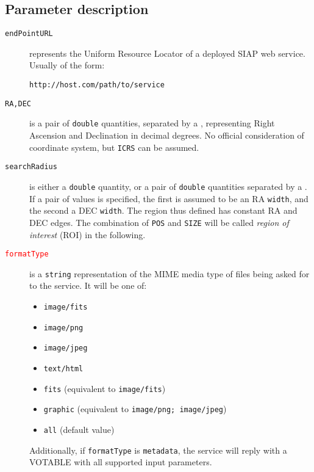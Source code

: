 	\subsection{Parameter description} %
	\label{sub:parameter_description_siap}
	\begin{description}
		\item[\texttt{endPointURL}] represents the Uniform Resource 
		Locator of a deployed SIAP web service. 
		Usually of the form:
		
		\texttt{http://host.com/path/to/service}

		\item[\texttt{RA,DEC}] is a pair of \texttt{double} 
		quantities, separated by a \comma, 
		representing Right Ascension and Declination 
		in decimal degrees. No official consideration of coordinate 
		system, but \texttt{ICRS} can be assumed.

		\item[\texttt{searchRadius}] is either a \texttt{double}
        quantity, or a pair of \texttt{double} quantities separated
        by a \comma. If a pair of values is specified, the first is
        assumed to be an RA \texttt{width}, and the second a DEC
        \texttt{width}. The region thus defined has constant RA and
        DEC edges. The combination of \texttt{POS} and \texttt{SIZE}
        will be called \emph{region of interest} (ROI) in the
        following.
	
		\item[\textcolor{red}{\texttt{formatType}}] is a \texttt{string} 
		representation of the MIME media type of files being asked 
		for to the service. It will be one of:
		
		\begin{itemize}
			\item \texttt{image/fits}
			\item \texttt{image/png}
			\item \texttt{image/jpeg}
			\item \texttt{text/html}
			\item \texttt{fits} (equivalent to \texttt{image/fits})
			\item \texttt{graphic} (equivalent to 
								    \texttt{image/png; image/jpeg})
			\item \texttt{all} (default value)
		\end{itemize}
		
		Additionally, if \texttt{formatType} is 
		\texttt{metadata}, the service will reply with a 
		VOTABLE with all supported input parameters.
		

\end{description}
